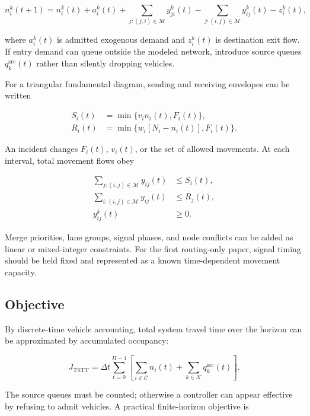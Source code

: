 \documentclass[11pt]{article}
\newcommand{\K}{\mathcal{K}}
\begin{document}
\begin{equation}
  n_i^k(t+1)
  = n_i^k(t)
  + a_i^k(t)
  + \sum_{j:(j,i)\in\mathcal{M}}y_{ji}^k(t)
  - \sum_{j:(i,j)\in\mathcal{M}}y_{ij}^k(t)
  - z_i^k(t),
  \label{eq:ctm-conservation}
\end{equation}

where \(a_i^k(t)\) is admitted exogenous demand and \(z_i^k(t)\) is destination exit
flow.  If entry demand can queue outside the modeled network, introduce source queues
\(q_k^{\mathrm{src}}(t)\) rather than silently dropping vehicles.

For a triangular fundamental diagram, sending and receiving envelopes can be written

\begin{align}
  S_i(t) &= \min\{v_i n_i(t),F_i(t)\},
  \\
  R_i(t) &= \min\{w_i[N_i-n_i(t)],F_i(t)\}.
  \label{eq:ctm-sr}
\end{align}

An incident changes \(F_i(t)\), \(v_i(t)\), or the set of allowed movements.  At each
interval, total movement flows obey

\begin{align}
  \sum_{j:(i,j)\in\mathcal{M}} y_{ij}(t)
    &\leq S_i(t),
  \\
  \sum_{i:(i,j)\in\mathcal{M}} y_{ij}(t)
    &\leq R_j(t),
  \\
  y_{ij}^k(t)&\geq 0.
  \label{eq:ctm-capacity}
\end{align}

Merge priorities, lane groups, signal phases, and node conflicts can be added as linear
or mixed-integer constraints.  For the first routing-only paper, signal timing should
be held fixed and represented as a known time-dependent movement capacity.

\subsection{Objective}

By discrete-time vehicle accounting, total system travel time over the horizon can be
approximated by accumulated occupancy:

\begin{equation}
  J_{\mathrm{TSTT}}
  = \Delta t\sum_{t=0}^{H-1}
      \left[
        \sum_{i\in\mathcal{C}}n_i(t)
        + \sum_{k\in\K}q_k^{\mathrm{src}}(t)
      \right].
  \label{eq:tstt}
\end{equation}

The source queues must be counted; otherwise a controller can appear effective by
refusing to admit vehicles.  A practical finite-horizon objective is
\end{document}
